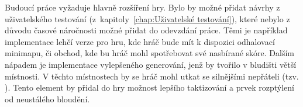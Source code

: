 Budoucí práce vyžaduje hlavně rozšíření hry. Bylo by možné přidat návrhy z uživatelského testování (z~kapitoly~\ref{chap:Uživatelské testování}), které nebylo z důvodu časové náročnosti možné přidat do odevzdání práce. Těmi je například implementace lehčí verze pro hru, kde hráč bude mít k dispozici odhalovací minimapu, či obchod, kde bu hráč mohl spotřebovat své nasbírané skóre. Dalším nápadem je implementace vylepšeného generování, jenž by tvořilo v bludišti větší místnosti. V těchto místnostech by se hráč mohl utkat se silnějšími nepřáteli (tzv. ). Tento element by přidal do hry možnost lepšího taktizování a prvek rozptýlení od neustálého bloudění.


%
